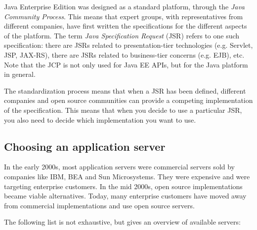 Java Enterprise Edition was designed as a standard platform, through the \emph{Java Community Process}. This means that expert groups, with representatives from different companies, have first written the specifications for the different aspects of the platform. The term \emph{Java Specification Request} (JSR) refers to one such specification: there are JSRs related to presentation-tier technologies (e.g. Servlet, JSP, JAX-RS), there are JSRs related to business-tier concerns (e.g. EJB), etc. Note that the JCP is not only used for Java EE APIs, but for the Java platform in general.


The standardization process means that when a JSR has been defined, different companies and open source communities can provide a competing implementation of the specification. This means that when you decide to use a particular JSR, you also need to decide which implementation you want to use.
 
\subsection{Choosing an application server}

In the early 2000s, most application servers were commercial servers sold by companies like IBM, BEA and Sun Microsystems. They were expensive and were targeting enterprise customers. In the mid 2000s, open source implementations became viable alternatives. Today, many enterprise customers have moved away from commercial implementations and use open source servers.

The following list is not exhaustive, but gives an overview of available servers:

